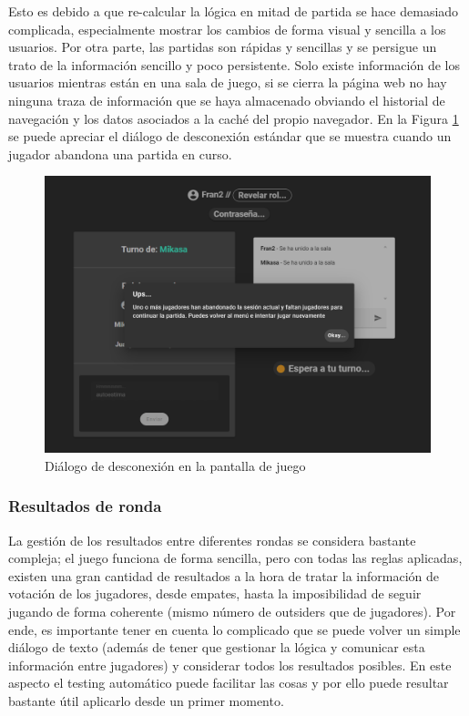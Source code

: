 Esto es debido a que re-calcular la lógica en mitad de partida se hace demasiado complicada, especialmente mostrar los cambios de forma visual y sencilla a los usuarios. Por otra parte, las partidas 
son rápidas y sencillas y se persigue un trato de la información sencillo y poco persistente. Solo existe información de los usuarios mientras están en una sala de juego, si se cierra la página 
web no hay ninguna traza de información que se haya almacenado obviando el historial de navegación y los datos asociados a la caché del propio navegador. En la Figura \ref{fig:res_desconexion}
se puede apreciar el diálogo de desconexión estándar que se muestra cuando un jugador abandona una partida en curso.

\begin{figure}[h]
	\centering
	\includegraphics[width=\textwidth,clip=true]{res_desconexion.png}
	\caption{Diálogo de desconexión en la pantalla de juego}
	\label{fig:res_desconexion}
\end{figure}


\subsubsection{Resultados de ronda}
\label{subsub:resultados_ronda}
La gestión de los resultados entre diferentes rondas se considera bastante compleja; el juego funciona de forma sencilla, pero con todas las reglas aplicadas,
existen una gran cantidad de resultados a la hora de tratar la información de votación de los jugadores, desde empates, hasta la imposibilidad de seguir jugando de forma coherente (mismo número de outsiders que de jugadores).
Por ende, es importante tener en cuenta lo complicado que se puede volver un simple diálogo de texto (además de tener 
que gestionar la lógica y comunicar esta información entre jugadores) y considerar todos los resultados posibles. En este aspecto el testing automático puede facilitar las
cosas y por ello puede resultar bastante útil aplicarlo desde un primer momento.

